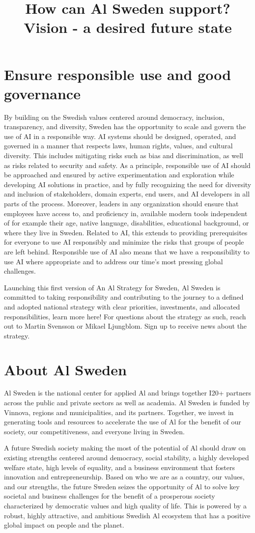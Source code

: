 \section*{Ensure responsible use and good governance}
By building on the Swedish values centered around democracy, inclusion, transparency, and diversity, Sweden has the opportunity to scale and govern the use of AI in a responsible way. AI systems should be designed, operated, and governed in a manner that respects laws, human rights, values, and cultural diversity. This includes mitigating risks such as bias and discrimination, as well as risks related to security and safety.
As a principle, responsible use of AI should be approached and ensured by active experimentation and exploration while developing AI solutions in practice, and by fully recognizing the need for diversity and inclusion of stakeholders, domain experts, end users, and AI developers in all parts of the process.
Moreover, leaders in any organization should ensure that employees have access to, and proficiency in, available modern tools independent of for example their age, native language, disabilities, educational background, or where they live in Sweden. Related to AI, this extends to providing prerequisites for everyone to use AI responsibly and minimize the risks that groups of people are left behind.
Responsible use of AI also means that we have a responsibility to use AI where appropriate and to address our time's most pressing global challenges.

\title{
How can Al Sweden support?
}
Launching this first version of An Al Strategy for Sweden, Al Sweden is committed to taking responsibility and contributing to the journey to a defined and adopted national strategy with clear priorities, investments, and allocated responsibilities, learn more here!
For questions about the strategy as such, reach out to Martin Svensson or Mikael Ljungblom.
Sign up to receive news about the strategy.
\section*{About Al Sweden}
Al Sweden is the national center for applied Al and brings together I20+ partners across the public and private sectors as well as academia. Al Sweden is funded by Vinnova, regions and municipalities, and its partners. Together, we invest in generating tools and resources to accelerate the use of Al for the benefit of our society, our competitiveness, and everyone living in Sweden.

\title{
Vision - a desired future state
}
A future Swedish society making the most of the potential of Al should draw on existing strengths centered around democracy, social stability, a highly developed welfare state, high levels of equality, and a business environment that fosters innovation and entrepreneurship.
Based on who we are as a country, our values, and our strengths, the future Sweden seizes the opportunity of Al to solve key societal and business challenges for the benefit of a prosperous society characterized by democratic values and high quality of life. This is powered by a robust, highly attractive, and ambitious Swedish Al ecosystem that has a positive global impact on people and the planet.

